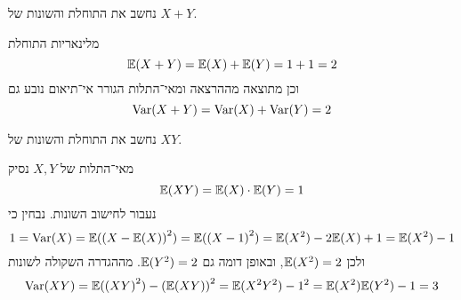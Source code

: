 \subquestion{}
נחשב את התוחלת והשונות של $X + Y$.
\begin{solution}
	מלינאריות התוחלת
	\[
		\mathbb{E}(X + Y) = \mathbb{E}(X) + \mathbb{E}(Y) = 1 + 1 = 2
	\]
	וכן מתוצאה מההרצאה ומאי־התלות הגורר אי־תיאום נובע גם
	\[
		\operatorname{Var}(X + Y) = \operatorname{Var}(X) + \operatorname{Var}(Y) = 2
	\]
\end{solution}

\subquestion{}
נחשב את התוחלת והשונות של $XY$.
\begin{solution}
	מאי־התלות של $X, Y$ נסיק
	\[
		\mathbb{E}(XY)
		= \mathbb{E}(X) \cdot \mathbb{E}(Y)
		= 1
	\]
	נעבור לחישוב השונות.
	נבחין כי
	\[
		1 = \operatorname{Var}(X)
		= \mathbb{E}({(X - \mathbb{E}(X))}^2)
		= \mathbb{E}({(X - 1)}^2)
		= \mathbb{E}(X^2) - 2 \mathbb{E}(X) + 1
		= \mathbb{E}(X^2) - 1
	\]
	ולכן $\mathbb{E}(X^2) = 2$, ובאופן דומה גם $\mathbb{E}(Y^2) = 2$.
	מההגדרה השקולה לשונות
	\[
		\operatorname{Var}(XY)
		= \mathbb{E}({(XY)}^2) - {(\mathbb{E}(XY))}^2
		= \mathbb{E}(X^2 Y^2) - 1^2
		= \mathbb{E}(X^2) \mathbb{E}(Y^2) - 1
		= 3
	\]
\end{solution}


